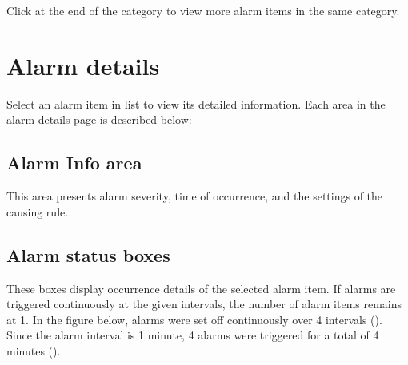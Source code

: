 \documentclass[letterpaper,10pt,english]{sphinxmanual}
\begin{document}
Click  at the end of the category to view more alarm items in the same category.
\begin{quote}

\begin{figure}[H]
\centering

\noindent{}
\end{figure}
\end{quote}


\section{Alarm details}
\label{\detokenize{anomaly/part05/index:alarm-details}}\label{\detokenize{anomaly/part05/index:id3}}
Select an alarm item in list to view its detailed information. Each area in the alarm details page is described below:


\subsection{Alarm Info area}
\label{\detokenize{anomaly/part05/index:alarm-info}}
This area presents alarm severity, time of occurrence, and the settings of the causing rule.
\begin{quote}

\begin{figure}[H]
\centering

\noindent{}
\end{figure}
\end{quote}


\subsection{Alarm status boxes}
\label{\detokenize{anomaly/part05/index:id4}}
These boxes display occurrence details of the selected alarm item. If alarms are triggered continuously at the given intervals, the number of alarm items remains at 1. In the figure below, alarms were set off continuously over 4 intervals (). Since the alarm interval is 1 minute, 4 alarms were triggered for a total of 4 minutes ().
\begin{quote}

\begin{figure}[H]
\centering

\noindent{}
\end{figure}
\end{quote}
\end{document}

